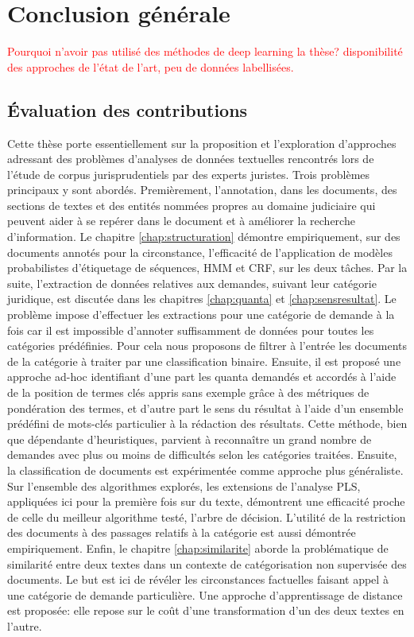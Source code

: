\chapter*{Conclusion générale}
\label{chap:conclusion}

\textcolor{red}{Pourquoi n'avoir pas utilisé des méthodes de deep learning la thèse? disponibilité des approches de l'état de l'art, peu de données labellisées.}

\section{Évaluation des contributions}
\label{sec:conclusion:contributions}
Cette thèse  porte essentiellement sur la proposition et l'exploration d'approches adressant des problèmes d'analyses de données textuelles rencontrés lors de l'étude de corpus jurisprudentiels par des experts juristes. Trois problèmes principaux y sont abordés. Premièrement, l'annotation, dans les documents, des sections de textes et des entités nommées propres au domaine judiciaire qui peuvent aider à se repérer dans le document et à améliorer la recherche d'information. Le chapitre \ref{chap:structuration}  démontre empiriquement, sur des documents annotés pour la circonstance, l'efficacité de l'application de modèles probabilistes d'étiquetage de séquences, HMM et CRF, sur les deux tâches. Par la suite, l'extraction de données relatives aux demandes, suivant leur catégorie juridique, est discutée dans les chapitres \ref{chap:quanta} et \ref{chap:sensresultat}. Le problème impose d'effectuer les extractions pour une catégorie de demande à la fois car il est impossible d'annoter suffisamment de données pour toutes les catégories prédéfinies. Pour cela nous proposons de filtrer à l'entrée les documents de la catégorie à traiter par une classification binaire. Ensuite, il est proposé une approche ad-hoc identifiant d'une part les quanta demandés et accordés à l'aide de la position de termes clés appris sans exemple grâce à des métriques de pondération des termes, et d'autre part le sens du résultat à l'aide d'un ensemble prédéfini de mots-clés particulier à la rédaction des résultats. Cette méthode, bien que dépendante d'heuristiques, parvient à reconnaître un grand nombre de demandes avec plus ou moins de difficultés selon les catégories traitées. Ensuite, la classification de documents est expérimentée comme approche plus généraliste. Sur l'ensemble des algorithmes explorés, les extensions de l'analyse PLS, appliquées ici pour la première fois sur du texte, démontrent une efficacité proche de celle du meilleur algorithme testé, l'arbre de décision.  L'utilité de la restriction des documents à des passages relatifs à la catégorie est aussi démontrée empiriquement. Enfin, le chapitre \ref{chap:similarite} aborde la problématique de similarité entre deux textes dans un contexte de catégorisation non supervisée des documents. Le but est ici de révéler les circonstances factuelles faisant appel à une catégorie de demande particulière. Une approche d'apprentissage de distance est proposée: elle repose sur le coût d'une transformation d'un des deux textes en l'autre.
